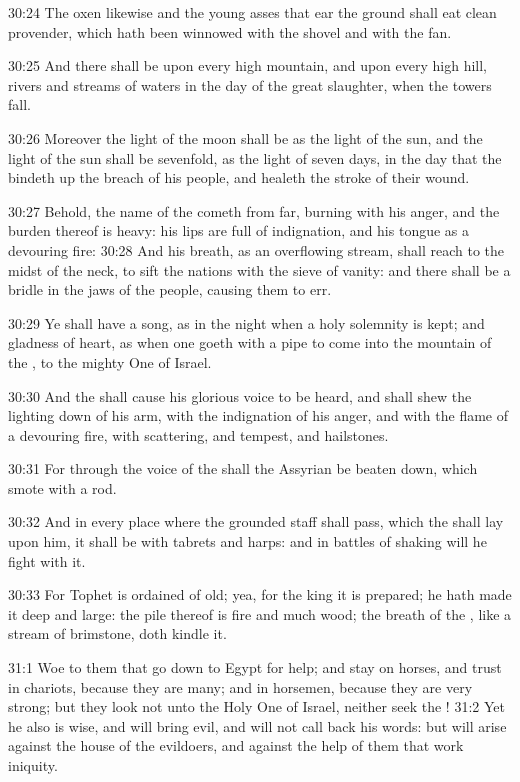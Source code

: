 30:24 The oxen likewise and the young asses that ear the ground shall
eat clean provender, which hath been winnowed with the shovel and with
the fan.

30:25 And there shall be upon every high mountain, and upon every high
hill, rivers and streams of waters in the day of the great slaughter,
when the towers fall.

30:26 Moreover the light of the moon shall be as the light of the sun,
and the light of the sun shall be sevenfold, as the light of seven
days, in the day that the \LORD bindeth up the breach of his people,
and healeth the stroke of their wound.

30:27 Behold, the name of the \LORD cometh from far, burning with his
anger, and the burden thereof is heavy: his lips are full of
indignation, and his tongue as a devouring fire: 30:28 And his breath,
as an overflowing stream, shall reach to the midst of the neck, to
sift the nations with the sieve of vanity: and there shall be a bridle
in the jaws of the people, causing them to err.

30:29 Ye shall have a song, as in the night when a holy solemnity is
kept; and gladness of heart, as when one goeth with a pipe to come
into the mountain of the \LORD, to the mighty One of Israel.

30:30 And the \LORD shall cause his glorious voice to be heard, and
shall shew the lighting down of his arm, with the indignation of his
anger, and with the flame of a devouring fire, with scattering, and
tempest, and hailstones.

30:31 For through the voice of the \LORD shall the Assyrian be beaten
down, which smote with a rod.

30:32 And in every place where the grounded staff shall pass, which
the \LORD shall lay upon him, it shall be with tabrets and harps: and
in battles of shaking will he fight with it.

30:33 For Tophet is ordained of old; yea, for the king it is prepared;
he hath made it deep and large: the pile thereof is fire and much
wood; the breath of the \LORD, like a stream of brimstone, doth kindle
it.

31:1 Woe to them that go down to Egypt for help; and stay on horses,
and trust in chariots, because they are many; and in horsemen, because
they are very strong; but they look not unto the Holy One of Israel,
neither seek the \LORD!  31:2 Yet he also is wise, and will bring evil,
and will not call back his words: but will arise against the house of
the evildoers, and against the help of them that work iniquity.

